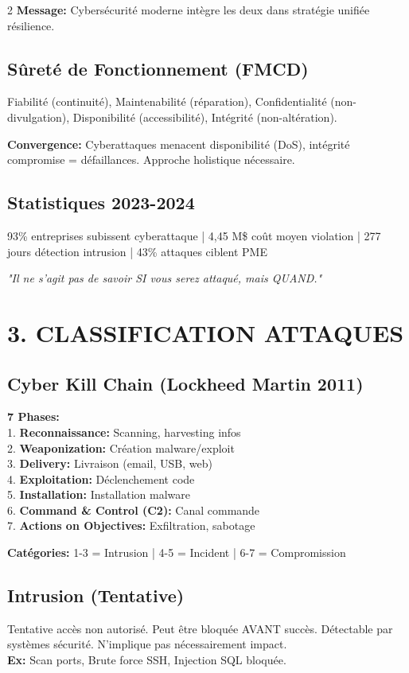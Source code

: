 \documentclass[9pt,a4paper]{extarticle}
\begin{document}
\begin{multicols}{2}
\textbf{Message:} Cybersécurité moderne intègre les deux dans stratégie unifiée résilience.

\subsection*{Sûreté de Fonctionnement (FMCD)}
Fiabilité (continuité), Maintenabilité (réparation), Confidentialité (non-divulgation), Disponibilité (accessibilité), Intégrité (non-altération).

\textbf{Convergence:} Cyberattaques menacent disponibilité (DoS), intégrité compromise = défaillances. Approche holistique nécessaire.

\subsection*{Statistiques 2023-2024}
93\% entreprises subissent cyberattaque | 4,45 M\$ coût moyen violation | 277 jours détection intrusion | 43\% attaques ciblent PME

\textit{"Il ne s'agit pas de savoir SI vous serez attaqué, mais QUAND."}

\section*{3. CLASSIFICATION ATTAQUES}

\subsection*{Cyber Kill Chain (Lockheed Martin 2011)}
\textbf{7 Phases:}\\
1. \textbf{Reconnaissance:} Scanning, harvesting infos\\
2. \textbf{Weaponization:} Création malware/exploit\\
3. \textbf{Delivery:} Livraison (email, USB, web)\\
4. \textbf{Exploitation:} Déclenchement code\\
5. \textbf{Installation:} Installation malware\\
6. \textbf{Command \& Control (C2):} Canal commande\\
7. \textbf{Actions on Objectives:} Exfiltration, sabotage

\textbf{Catégories:} 1-3 = Intrusion | 4-5 = Incident | 6-7 = Compromission

\subsection*{Intrusion (Tentative)}
Tentative accès non autorisé. Peut être bloquée AVANT succès. Détectable par systèmes sécurité. N'implique pas nécessairement impact.\\
\textbf{Ex:} Scan ports, Brute force SSH, Injection SQL bloquée.


\end{multicols}
\end{document}
